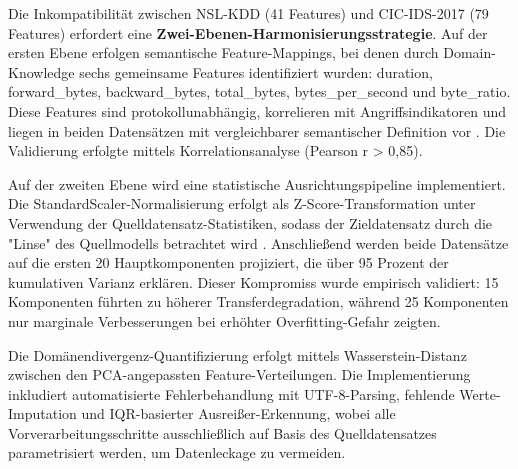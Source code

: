 \documentclass[11pt,a4paper]{article}
\begin{document}

    Die Inkompatibilität zwischen NSL-KDD (41 Features) und CIC-IDS-2017 (79 Features) erfordert eine \textbf{Zwei-Ebenen-Harmonisierungsstrategie}. Auf der ersten Ebene erfolgen semantische Feature-Mappings, bei denen durch Domain-Knowledge sechs gemeinsame Features identifiziert wurden: duration, forward\_bytes, backward\_bytes, total\_bytes, bytes\_per\_second und byte\_ratio. Diese Features sind protokollunabhängig, korrelieren mit Angriffsindikatoren und liegen in beiden Datensätzen mit vergleichbarer semantischer Definition vor \parencite{Gharib2016}. Die Validierung erfolgte mittels Korrelationsanalyse (Pearson r > 0,85).

    Auf der zweiten Ebene wird eine statistische Ausrichtungspipeline implementiert. Die StandardScaler-Normalisierung erfolgt als Z-Score-Transformation unter Verwendung der Quelldatensatz-Statistiken, sodass der Zieldatensatz durch die "Linse" des Quellmodells betrachtet wird \parencite{Goodfellow2016}. Anschließend werden beide Datensätze auf die ersten 20 Hauptkomponenten projiziert, die über 95 Prozent der kumulativen Varianz erklären. Dieser Kompromiss wurde empirisch validiert: 15 Komponenten führten zu höherer Transferdegradation, während 25 Komponenten nur marginale Verbesserungen bei erhöhter Overfitting-Gefahr zeigten.

    Die Domänendivergenz-Quantifizierung erfolgt mittels Wasserstein-Distanz zwischen den PCA-angepassten Feature-Verteilungen. Die Implementierung inkludiert automatisierte Fehlerbehandlung mit UTF-8-Parsing, fehlende Werte-Imputation und IQR-basierter Ausreißer-Erkennung, wobei alle Vorverarbeitungsschritte ausschließlich auf Basis des Quelldatensatzes parametrisiert werden, um Datenleckage zu vermeiden.
\end{document}
